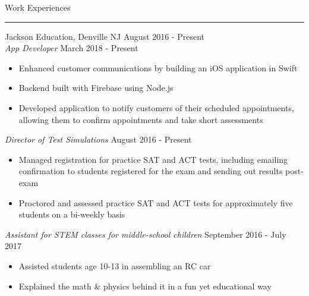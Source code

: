 \documentclass{article}
\newcommand \spacingBetweenHeadings {0.5em}
\begin{document}
\noindent
\huge Work Experiences\par
\vspace{0.1em}
\hrule
\Large
\vspace{1em}
\noindent
Jackson Education, Denville NJ
\hfill
August 2016 - Present\\
\textit{App Developer}
\hfill
March 2018 - Present\\
\vspace{-1em}
\begin{itemize}
\item Enhanced customer communications by building an iOS application in Swift
\item Backend built with Firebase using Node.js
\item Developed application to notify customers of their scheduled appointments, allowing them to \mbox{confirm} appointments and take short assessments
\end{itemize}
\textit{Director of Test Simulations}
\hfill
August 2016 - Present\\
\vspace{-1em}
\begin{itemize}
\item Managed registration for practice SAT and ACT tests, including emailing confirmation to students registered for the exam and sending out results post-exam
\item Proctored and assessed practice SAT and ACT tests for approximately five students on a bi-weekly basis
\end{itemize}
\textit{Assistant for STEM classes for middle-school children}
\hfill
September 2016 - July 2017
\begin{itemize}
\item Assisted students age 10-13 in assembling an RC car
\item Explained the math \& physics behind it in a fun yet educational way
\end{itemize}
\vspace{\spacingBetweenHeadings}
\end{document}
